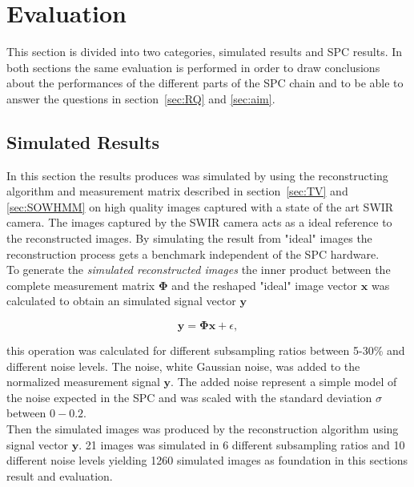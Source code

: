 \section{Evaluation}
\label{sec:Evaluation} 
This section is divided into two categories, simulated results and SPC results. In both sections the same evaluation is performed in order to draw conclusions about the performances of the different parts of the SPC chain and to be able to answer the questions in section~\ref{sec:RQ} and \ref{sec:aim}.\\[0.1in]



\subsection{Simulated Results}
\label{sec:simulated_results}
In this section the results produces was simulated by using the reconstructing algorithm and measurement matrix described in section~\ref{sec:TV} and \ref{sec:SOWHMM} on high quality images captured with a state of the art SWIR camera. The images captured by the SWIR camera acts as a ideal reference to the reconstructed images. By simulating the result from "ideal" images the reconstruction process gets a benchmark independent of the SPC hardware.\\[0.1in]

To generate the \textit{simulated reconstructed images} the inner product between the complete measurement matrix $\mathbf{\Phi}$ and the reshaped "ideal" image vector $\mathbf{x}$ was calculated to obtain an simulated signal vector $\mathbf{y}$

\begin{equation}
\mathbf{y} = \mathbf{\Phi}\mathbf{x} + \epsilon,
\end{equation} 
 
this operation was calculated for different subsampling ratios between 5-30\% and different noise levels. The noise, white Gaussian noise, was added to the normalized measurement signal $\mathbf{y}$. The added noise represent a simple model of the noise expected in the SPC and was scaled with the standard deviation $\sigma$ between $0 - 0.2$. \\[0.1in] 

Then the simulated images was produced by the reconstruction algorithm using signal vector $\mathbf{y}$. 21 images was simulated in 6 different subsampling ratios and 10 different noise levels yielding 1260 simulated images as foundation in this sections result and evaluation.

